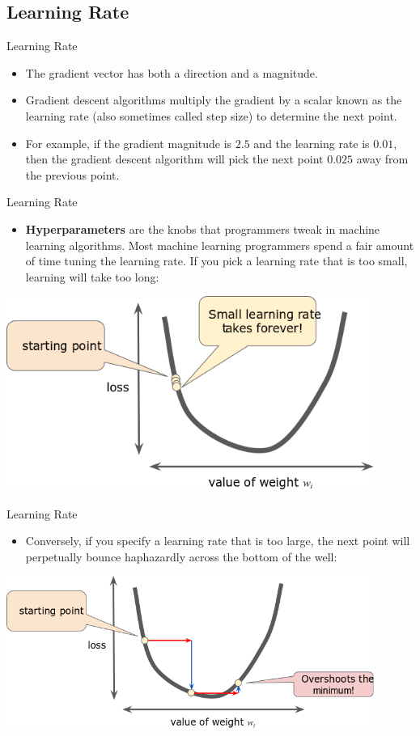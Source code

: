 \documentclass{beamer}
\begin{document}
\subsection{Learning Rate}

\begin{frame}{Learning Rate}
\begin{itemize}
    \item The gradient vector has both a direction and a magnitude. 
    \item Gradient descent algorithms multiply the gradient by a scalar known as the learning rate (also sometimes called step size) to determine the next point. 
    \item For example, if the gradient magnitude is $2.5$ and the learning rate is $0.01$, then the gradient descent algorithm will pick the next point $0.025$ away from the previous point.
\end{itemize}
\end{frame}

\begin{frame}{Learning Rate}
\begin{itemize}
    \item {\bf Hyperparameters} are the knobs that programmers tweak in machine learning algorithms. Most machine learning programmers spend a fair amount of time tuning the learning rate. If you pick a learning rate that is too small, learning will take too long:
\end{itemize}
\includegraphics[width=0.9\textwidth]{images/LearningRateTooSmall.png}
\end{frame}


\begin{frame}{Learning Rate}
\begin{itemize}
    \item Conversely, if you specify a learning rate that is too large, the next point will perpetually bounce haphazardly across the bottom of the well:
\end{itemize}
\includegraphics[width=0.9\textwidth]{images/LearningRateTooLarge.png}
\end{frame}
\end{document}
